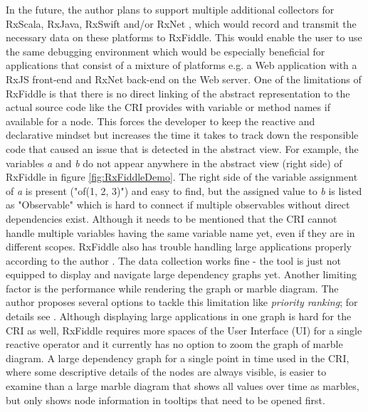 	In the future, the author plans to support multiple additional collectors for RxScala, RxJava, RxSwift and/or RxNet \cite{RxFiddleTutorials}, which would record and transmit the necessary data on these platforms to RxFiddle. This would enable the user to use the same debugging environment which would be especially beneficial for applications that consist of a mixture of platforms e.g. a Web application with a RxJS front-end and RxNet back-end on the Web server.
	One of the limitations of RxFiddle is that there is no direct linking of the abstract representation to the actual source code like the CRI provides with variable or method names if available for a node. This forces the developer to keep the reactive and declarative mindset but increases the time it takes to track down the responsible code that caused an issue that is detected in the abstract view. For example, the variables \emph{a} and \emph{b} do not appear anywhere in the abstract view (right side) of RxFiddle in figure \ref{fig:RxFiddleDemo}. The right side of the variable assignment of \emph{a} is present ("of(1, 2, 3)") and easy to find, but the assigned value to \emph{b} is listed as "Observable" which is hard to connect if multiple observables without direct dependencies exist. Although it needs to be mentioned that the CRI cannot handle multiple variables having the same variable name yet, even if they are in different scopes.
	RxFiddle also has trouble handling large applications properly according to the author \cite[Issue 6]{RxFiddleGitHub}. The data collection works fine - the tool is just not equipped to display and navigate large dependency graphs yet. Another limiting factor is the performance while rendering the graph or marble diagram. The author proposes several options to tackle this limitation like \emph{priority ranking}; for details see \cite[Issue 6]{RxFiddleGitHub}. Although displaying large applications in one graph is hard for the CRI as well, RxFiddle requires more spaces of the User Interface (UI) for a single reactive operator and it currently has no option to zoom the graph of marble diagram. A large dependency graph for a single point in time used in the CRI, where some descriptive details of the nodes are always visible, is easier to examine than a large marble diagram that shows all values over time as marbles, but only shows node information in tooltips that need to be opened first.

